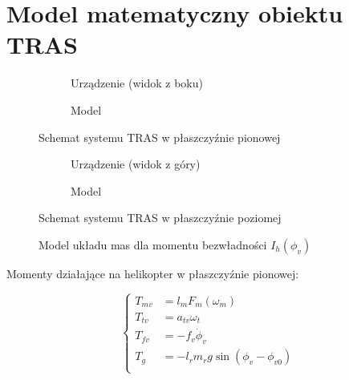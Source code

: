 \section{Model matematyczny obiektu TRAS}

\begin{figure}[!htb]
  \centering
  \begin{subfigure}[b]{0.4\textwidth}
    
    \caption{Urządzenie (widok z boku)}
    \label{rys:schtrasv}
  \end{subfigure}
  \begin{subfigure}[b]{0.25\textwidth}
    
    \vspace{0.8cm}
    \caption{Model}
    \label{rys:schmodelv}
  \end{subfigure}
  \caption{Schemat systemu TRAS w płaszczyźnie pionowej}
\end{figure}

\begin{figure}[!htb]
  \centering
  \begin{subfigure}[b]{0.4\textwidth}
    
    \caption{Urządzenie (widok z góry)}
    \label{rys:schtrash}
  \end{subfigure}
  \begin{subfigure}[b]{0.25\textwidth}
    
    \vspace{2.7cm}
    \caption{Model}
    \label{rys:schmodelh}
  \end{subfigure}
  \caption{Schemat systemu TRAS w płaszczyźnie poziomej}
\end{figure}

\begin{figure}[!htb]
  \centering
  
  \label{rys:schih}
  \caption{Model układu mas dla momentu bezwładności $I_h(\phi_v)$}
\end{figure}

\newpage

Momenty działające na helikopter w płaszczyźnie pionowej:

\begin{equation}
  \begin{cases}
    T_{mv} & = l_mF_m(\omega_m) \\
    T_{tv} & = a_{tv}\omega_t \\
    T_{fv} & = -f_v\dot{\phi}_v \\
    T_g    & = -l_rm_rg\sin(\phi_v-\phi_{v0}) \\
  \end{cases}
\end{equation}

